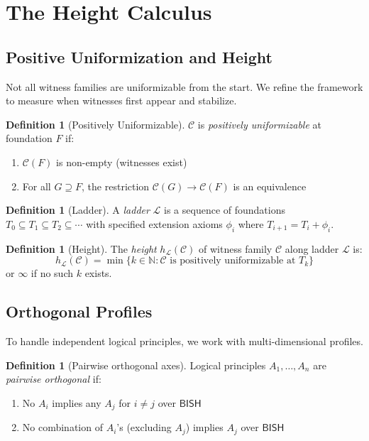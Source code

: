 \documentclass[11pt]{article}
\theoremstyle{plain}
\theoremstyle{definition}
\newtheorem{definition}[theorem]{Definition}
\newcommand{\N}{\mathbb{N}}
\newcommand{\BISH}{\mathsf{BISH}}
\begin{document}
\section{The Height Calculus}

\subsection{Positive Uniformization and Height}

Not all witness families are uniformizable from the start. We refine the framework to measure when witnesses first appear and stabilize.

\begin{definition}[Positively Uniformizable]\label{def:pos-unif}
$\mathcal{C}$ is \emph{positively uniformizable} at foundation $F$ if:
\begin{enumerate}
\item $\mathcal{C}(F)$ is non-empty (witnesses exist)
\item For all $G \supseteq F$, the restriction $\mathcal{C}(G) \to \mathcal{C}(F)$ is an equivalence
\end{enumerate}
\end{definition}

\begin{definition}[Ladder]\label{def:ladder}
A \emph{ladder} $\mathcal{L}$ is a sequence of foundations $T_0 \subseteq T_1 \subseteq T_2 \subseteq \cdots$ with specified extension axioms $\phi_i$ where $T_{i+1} = T_i + \phi_i$.
\end{definition}

\begin{definition}[Height]\label{def:height}
The \emph{height} $h_{\mathcal{L}}(\mathcal{C})$ of witness family $\mathcal{C}$ along ladder $\mathcal{L}$ is:
\[
h_{\mathcal{L}}(\mathcal{C}) = \min\{k \in \N : \mathcal{C} \text{ is positively uniformizable at } T_k\}
\]
or $\infty$ if no such $k$ exists.
\end{definition}

\subsection{Orthogonal Profiles}

To handle independent logical principles, we work with multi-dimensional profiles.

\begin{definition}[Pairwise orthogonal axes]\label{def:orthogonal}
Logical principles $A_1, \ldots, A_n$ are \emph{pairwise orthogonal} if:
\begin{enumerate}
\item No $A_i$ implies any $A_j$ for $i \neq j$ over $\BISH$
\item No combination of $A_i$'s (excluding $A_j$) implies $A_j$ over $\BISH$
\end{enumerate}
\end{definition}
\end{document}
